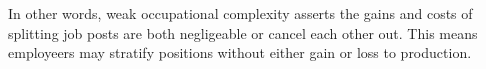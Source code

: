 \documentclass[hidelinks, nonatbib]{elsarticle}
\begin{document}
\begin{axiom}
\begin{subaxiom}
    In other words, weak occupational complexity asserts the gains and costs of splitting job posts are both negligeable or cancel each other out. This means employeers may stratify positions without either gain or loss to production.

\end{subaxiom}
\end{axiom}
\end{document}
